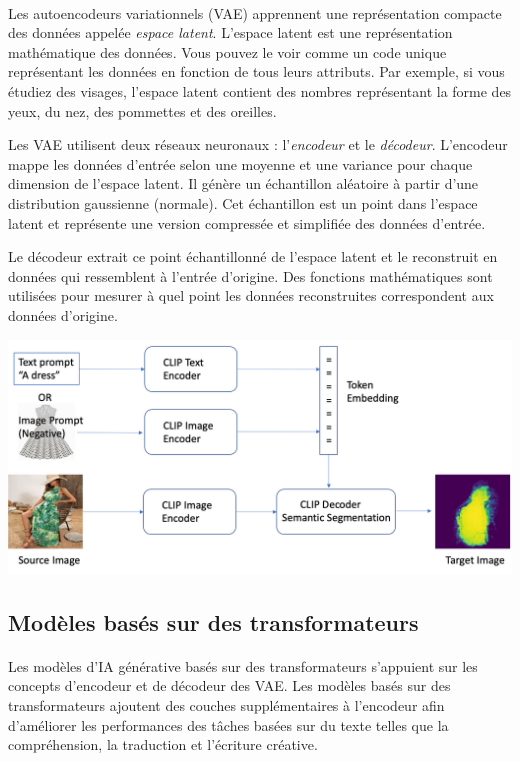 \paragraph{}
Les autoencodeurs variationnels (VAE) apprennent une représentation compacte des
données appelée \textit{espace latent}. L'espace latent est une représentation
mathématique des données. Vous pouvez le voir comme un code unique représentant les
données en fonction de tous leurs attributs. Par exemple, si vous étudiez des visages,
l'espace latent contient des nombres représentant la forme des yeux, du nez, des
pommettes et des oreilles.

Les VAE utilisent deux réseaux neuronaux : l’\textit{encodeur} et le \textit{décodeur}.
L'encodeur mappe les données d'entrée selon une moyenne et une variance pour
chaque dimension de l'espace latent. Il génère un échantillon aléatoire à partir
d'une distribution gaussienne (normale). Cet échantillon est un point dans l'espace
latent et représente une version compressée et simplifiée des données d'entrée.

Le décodeur extrait ce point échantillonné de l'espace latent et le reconstruit
en données qui ressemblent à l'entrée d'origine. Des fonctions mathématiques sont
utilisées pour mesurer à quel point les données reconstruites correspondent aux données
d'origine.

\vspace{1cm}
\includegraphics[width=\textwidth]{images/clipseg_architecture-1.png}
\vspace{1cm}

\subsection{Modèles basés sur des transformateurs}
\paragraph{}
Les modèles d'IA générative basés sur des transformateurs s'appuient sur les concepts
d'encodeur et de décodeur des VAE. Les modèles basés sur des transformateurs
ajoutent des couches supplémentaires à l'encodeur afin d'améliorer les
performances des tâches basées sur du texte telles que la compréhension, la traduction
et l'écriture créative.

